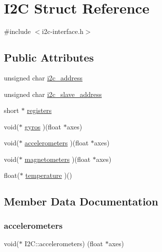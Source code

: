 \hypertarget{structI2C}{}\section{I2C Struct Reference}
\label{structI2C}


{\ttfamily \#include $<$i2c-\/interface.\+h$>$}

\subsection*{Public Attributes}
\begin{DoxyCompactItemize}
\item 
unsigned char \hyperlink{structI2C_a2cb6b6925aa9cf1d5f878b33d176df26}{i2c\+\_\+address}
\item 
unsigned char \hyperlink{structI2C_a2f9f539ab4ca498f89fb6e95334d0354}{i2c\+\_\+slave\+\_\+address}
\item 
short $\ast$ \hyperlink{structI2C_a0bf74755f449fe6216c70bea75367332}{registers}
\item 
void($\ast$ \hyperlink{structI2C_a057e451794e3497ac6a0daa29d89fa49}{gyros} )(float $\ast$axes)
\item 
void($\ast$ \hyperlink{structI2C_a364b791b69beaa2ef1111d8ec5565c6a}{accelerometers} )(float $\ast$axes)
\item 
void($\ast$ \hyperlink{structI2C_a1d9c6b23b7f65aeeb371e56134e90472}{magnetometers} )(float $\ast$axes)
\item 
float($\ast$ \hyperlink{structI2C_ad0c119ae909b7d0e608abc3a48910ce2}{temperature} )()
\end{DoxyCompactItemize}


\subsection{Member Data Documentation}
\mbox{\label{structI2C_a364b791b69beaa2ef1111d8ec5565c6a}} 
\subsubsection{\texorpdfstring{accelerometers}{accelerometers}}
{\footnotesize\ttfamily void($\ast$  I2\+C\+::accelerometers) (float $\ast$axes)}

\mbox{\label{structI2C_a057e451794e3497ac6a0daa29d89fa49}} 
